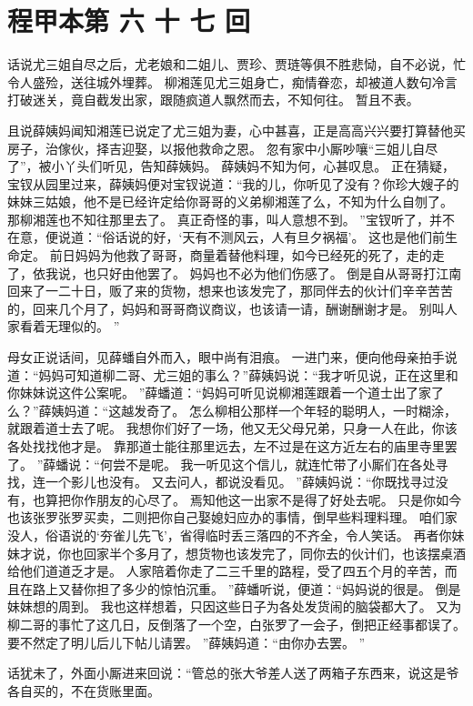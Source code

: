 \chapter{程甲本第 六 十 七 回}
话说尤三姐自尽之后，尤老娘和二姐儿、贾珍、贾琏等俱不胜悲恸，自不必说，忙令人盛殓，送往城外埋葬。
柳湘莲见尤三姐身亡，痴情眷恋，却被道人数句冷言打破迷关，竟自截发出家，跟随疯道人飘然而去，不知何往。
暂且不表。
\par
且说薛姨妈闻知湘莲已说定了尤三姐为妻，心中甚喜，正是高高兴兴要打算替他买房子，治傢伙，择吉迎娶，以报他救命之恩。
忽有家中小厮吵嚷“三姐儿自尽了”，被小丫头们听见，告知薛姨妈。
薛姨妈不知为何，心甚叹息。
正在猜疑，宝钗从园里过来，薛姨妈便对宝钗说道：“我的儿，你听见了没有？你珍大嫂子的妹妹三姑娘，他不是已经许定给你哥哥的义弟柳湘莲了么，不知为什么自刎了。
那柳湘莲也不知往那里去了。
真正奇怪的事，叫人意想不到。
”宝钗听了，并不在意，便说道：“俗话说的好，‘天有不测风云，人有旦夕祸福’。
这也是他们前生命定。
前日妈妈为他救了哥哥，商量着替他料理，如今已经死的死了，走的走了，依我说，也只好由他罢了。
妈妈也不必为他们伤感了。
倒是自从哥哥打江南回来了一二十日，贩了来的货物，想来也该发完了，那同伴去的伙计们辛辛苦苦的，回来几个月了，妈妈和哥哥商议商议，也该请一请，酬谢酬谢才是。
别叫人家看着无理似的。
”\par
母女正说话间，见薛蟠自外而入，眼中尚有泪痕。
一进门来，便向他母亲拍手说道：“妈妈可知道柳二哥、尤三姐的事么？”薛姨妈说：“我才听见说，正在这里和你妹妹说这件公案呢。
”薛蟠道：“妈妈可听见说柳湘莲跟着一个道士出了家了么？”薛姨妈道：“这越发奇了。
怎么柳相公那样一个年轻的聪明人，一时糊涂，就跟着道士去了呢。
我想你们好了一场，他又无父母兄弟，只身一人在此，你该各处找找他才是。
靠那道士能往那里远去，左不过是在这方近左右的庙里寺里罢了。
”薛蟠说：“何尝不是呢。
我一听见这个信儿，就连忙带了小厮们在各处寻找，连一个影儿也没有。
又去问人，都说没看见。
”薛姨妈说：“你既找寻过没有，也算把你作朋友的心尽了。
焉知他这一出家不是得了好处去呢。
只是你如今也该张罗张罗买卖，二则把你自己娶媳妇应办的事情，倒早些料理料理。
咱们家没人，俗语说的‘夯雀儿先飞’，省得临时丢三落四的不齐全，令人笑话。
再者你妹妹才说，你也回家半个多月了，想货物也该发完了，同你去的伙计们，也该摆桌酒给他们道道乏才是。
人家陪着你走了二三千里的路程，受了四五个月的辛苦，而且在路上又替你担了多少的惊怕沉重。
”薛蟠听说，便道：“妈妈说的很是。
倒是妹妹想的周到。
我也这样想着，只因这些日子为各处发货闹的脑袋都大了。
又为柳二哥的事忙了这几日，反倒落了一个空，白张罗了一会子，倒把正经事都误了。
要不然定了明儿后儿下帖儿请罢。
”薛姨妈道：“由你办去罢。
”\par
话犹未了，外面小厮进来回说：“管总的张大爷差人送了两箱子东西来，说这是爷各自买的，不在货账里面。
